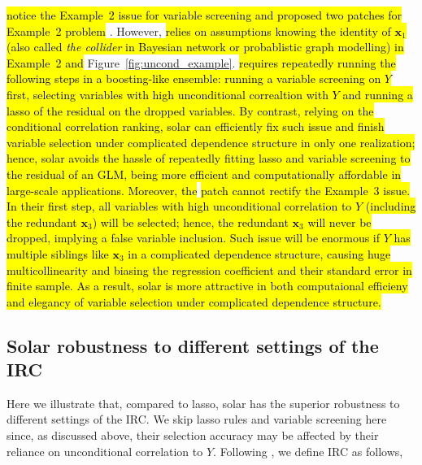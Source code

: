 \documentclass[12pt]{article}
\begin{document}
\citet{fan2008sure} \hl{notice the Example~2 issue for variable screening and proposed two patches for Example~2 problem} \citep{fan2008sure, barut2016conditional}. However, \citet{barut2016conditional} \hl{relies on assumptions knowing the identity of $\mathbf{x}_1$ (also called \emph{the collider} in Bayesian network or probablistic graph modelling) in Example~2 and} Figure~\ref{fig:uncond_example}. \citet{fan2008sure} \hl{requires repeatedly running the following steps in a boosting-like ensemble: running a variable screening on $Y$ first, selecting variables with high unconditional correaltion with $Y$ and running a lasso of the residual on the dropped variables. By contrast, relying on the conditional correlation ranking, solar can efficiently fix such issue and finish variable selection under complicated dependence structure in only one realization; hence, solar avoids the hassle of repeatedly fitting lasso and variable screening to the residual of an GLM, being more efficient and computationally affordable in large-scale applications. Moreover, the} \citet{fan2008sure} \hl{patch cannot rectify the Example~3 issue. In their first step, all variables with high unconditional correlation to $Y$ (including the redundant $\mathbf{x}_3$) will be selected; hence, the redundant $\mathbf{x}_3$ will never be dropped, implying a false variable inclusion. Such issue will be enormous if $Y$ has multiple siblings like $\mathbf{x}_3$ in a complicated dependence structure, causing huge multicollinearity and biasing the regression coefficient and their standard error in finite sample. As a result, solar is more attractive in both computaional efficieny and elegancy of variable selection under complicated dependence structure.}


\subsection{Solar robustness to different settings of the IRC \label{subsection:irc}}

Here we illustrate that, compared to lasso, solar has the superior robustness to different settings of the IRC. We skip lasso rules and variable screening here since, as discussed above, their selection accuracy may be affected by their reliance on unconditional correlation to $Y$. Following \citet{zhang09}, we define IRC as follows,
\end{document}
